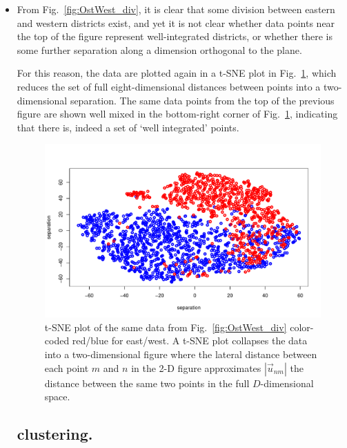 \documentclass[amsmath,amssymb,nofootinbib,12pt,preprint]{revtex4}
\begin{document}
\begin{itemize}
\item From Fig.~\ref{fig:OstWest_div}, it is clear that some division between eastern and western districts exist, and yet it is not clear whether data points near the top of the figure represent well-integrated districts, or whether there is some further separation along a dimension orthogonal to the plane. 


For this reason, the data are plotted again in a t-SNE plot in Fig.~\ref{fig:tsne_OW}, which reduces the set of full eight-dimensional distances between points into a two-dimensional separation.  The same data points from the top of the previous figure are shown well mixed in the bottom-right corner of Fig.~\ref{fig:tsne_OW}, indicating that there is, indeed a set of `well integrated' points.

\begin{figure}[h]%
\includegraphics[scale=.5]{../figures/tsne_OstWest_Vote2}%
\caption{t-SNE plot of the same data from Fig.~\ref{fig:OstWest_div} color-coded red/blue for east/west. A t-SNE plot collapses the data into a two-dimensional figure where the lateral distance between each point $m$ and $n$ in the 2-D figure approximates $\left| \vec u_{nm}\right|$ the distance between the same two points in the full $D$-dimensional space.}
\label{fig:tsne_OW}%
\end{figure}

\subsection{clustering.}


\end{itemize}
\end{document}
